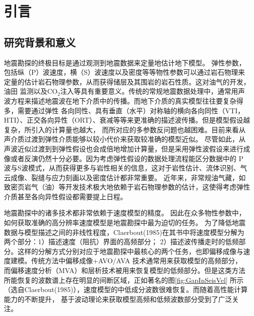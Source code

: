\chapter{引言}
\section{研究背景和意义}
地震勘探的终极目标是通过观测到地震数据来定量地估计地下模型。
弹性参数，包括纵（P）波速度，横（S）波速度以及密度等等物性参数可以通过岩石物理来定量的估计岩石物理参数，从而获得储层及其围岩的岩石性质。这对油气的开发，油田
监测以及CO$_2$注入等具有重要意义。传统的常规地震数据处理中，通常用声波方程来描述地震波在地下介质中的传播。而地下介质的真实模型往往要复杂得多，需要通过弹性
各向同性、具有垂直（水平）对称轴的横向各向同性（VTI，HTI）、正交各向异性（ORT）、衰减等等来更准确的描述波传播。但是模型假设越复杂，所引入的计算量也越大，
而所对应的多参数反问题也越困难。目前来看从声介质过渡到弹性介质能够以较小代价来获取较准确的模型近似。
尽管如此，从声波近似过渡到到弹性假设也会成倍地增加计算量，但是采用弹性波假设来进行成像或者反演仍然十分必要。因为考虑弹性假设的数据处理流程能区分数据中的
P波与S波模式，从而获得更多与岩性相关的信息，这对于岩性估计、流体识别、气云成像、裂缝与应力刻画以及密度估计都非常重要。
近年来，非常规油气藏，如致密页岩气（油）等开发技术极大地依赖于岩石物理参数的估计，这使得考虑弹性介质甚至各向异性假设都需要提上日程。

地震勘探中的诸多技术都非常依赖于速度模型的精度。
因此在众多物性参数中，如何获取准确的高分辨率速度模型是地震勘探中最为迫切的任务。
为了降低地震数据与模型描述之间的非线性程度，Claerbout(1985)\cite{Claerbout1985Imaging}在其书中将速度模型分解为两个部分：1）描述速度（阻抗）界面的高频部分；
2）描述波传播走时的低频部分。这样的分解方式分别对应于地震勘探中最核心的两个任务，也即偏移成像与速度建模。传统方法中偏移成像+AVO/AVA
技术通常用来获取模型的高频部分，
而偏移速度分析（MVA）和层析技术被用来恢复模型的低频部分。但是这类方法所能恢复的波数谱上存在明显的间断区域，正如著名的图\ref{fig:GapInSeisVel}
所示（选自Claerbout(1985)\cite{Claerbout1985Imaging}），速度模型的中低成分波数很难恢复。而随着高性能计算能力的不断提升，
基于波动理论来获取模型高频和低频波数部分受到了广泛关注。

